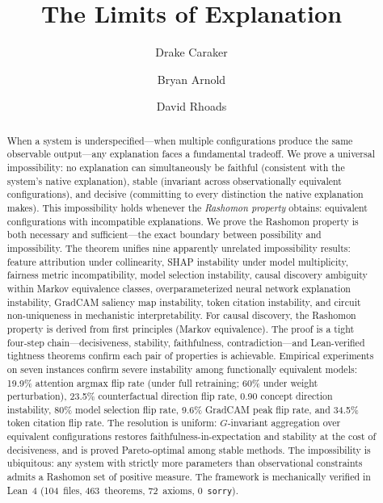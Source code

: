 \documentclass{article}
\title{The Limits of Explanation}
\author{Drake Caraker \and Bryan Arnold \and David Rhoads}
\begin{document}
\maketitle

\begin{abstract}
When a system is underspecified---when multiple configurations produce the
same observable output---any explanation faces a fundamental tradeoff.
We prove a universal impossibility: no explanation can simultaneously be
faithful (consistent with the system's native explanation), stable
(invariant across observationally equivalent configurations), and decisive
(committing to every distinction the native explanation makes).
This impossibility holds whenever the \emph{Rashomon property} obtains:
equivalent configurations with incompatible explanations.
We prove the Rashomon property is both necessary and sufficient---the exact
boundary between possibility and impossibility.
The theorem unifies nine apparently unrelated impossibility results:
feature attribution under collinearity, SHAP instability under model
multiplicity, fairness metric incompatibility, model selection instability,
causal discovery ambiguity within Markov equivalence classes, overparameterized
neural network explanation instability, GradCAM saliency map instability,
token citation instability, and circuit non-uniqueness in mechanistic
interpretability.
For causal discovery, the Rashomon property is derived from first principles
(Markov equivalence).
The proof is a tight four-step chain---decisiveness, stability, faithfulness,
contradiction---and Lean-verified tightness theorems confirm each pair of
properties is achievable.
Empirical experiments on seven instances confirm severe instability among
functionally equivalent models: 19.9\% attention argmax flip rate
(under full retraining; 60\% under weight perturbation), 23.5\%
counterfactual direction flip rate, 0.90 concept direction instability,
80\% model selection flip rate, 9.6\% GradCAM peak flip rate, and 34.5\%
token citation flip rate.
The resolution is uniform: $G$-invariant aggregation over equivalent
configurations restores faithfulness-in-expectation and stability at
the cost of decisiveness, and is proved Pareto-optimal among stable methods.
The impossibility is ubiquitous: any system with strictly more parameters
than observational constraints admits a Rashomon set of positive measure.
The framework is mechanically verified in Lean~4 (104~files, 463~theorems,
72~axioms, 0~\texttt{sorry}).
\end{abstract}
\end{document}
